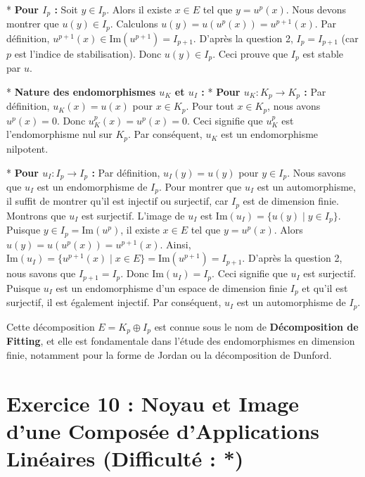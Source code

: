 \documentclass{report}
\begin{document}
        *   \textbf{Pour $I_p$ :}
            Soit $y \in I_p$. Alors il existe $x \in E$ tel que $y = u^p(x)$.
            Nous devons montrer que $u(y) \in I_p$.
            Calculons $u(y) = u(u^p(x)) = u^{p+1}(x)$.
            Par définition, $u^{p+1}(x) \in \mathrm{Im}(u^{p+1}) = I_{p+1}$.
            D'après la question 2, $I_p = I_{p+1}$ (car $p$ est l'indice de stabilisation).
            Donc $u(y) \in I_p$.
            Ceci prouve que $I_p$ est stable par $u$.

    *   \textbf{Nature des endomorphismes $u_K$ et $u_I$ :}
        *   \textbf{Pour $u_K : K_p \to K_p$ :}
            Par définition, $u_K(x) = u(x)$ pour $x \in K_p$.
            Pour tout $x \in K_p$, nous avons $u^p(x) = 0$.
            Donc $u_K^p(x) = u^p(x) = 0$.
            Ceci signifie que $u_K^p$ est l'endomorphisme nul sur $K_p$.
            Par conséquent, $u_K$ est un endomorphisme nilpotent.

        *   \textbf{Pour $u_I : I_p \to I_p$ :}
            Par définition, $u_I(y) = u(y)$ pour $y \in I_p$.
            Nous savons que $u_I$ est un endomorphisme de $I_p$.
            Pour montrer que $u_I$ est un automorphisme, il suffit de montrer qu'il est injectif ou surjectif, car $I_p$ est de dimension finie.
            Montrons que $u_I$ est surjectif.
            L'image de $u_I$ est $\mathrm{Im}(u_I) = \{u(y) \mid y \in I_p\}$.
            Puisque $y \in I_p = \mathrm{Im}(u^p)$, il existe $x \in E$ tel que $y = u^p(x)$.
            Alors $u(y) = u(u^p(x)) = u^{p+1}(x)$.
            Ainsi, $\mathrm{Im}(u_I) = \{u^{p+1}(x) \mid x \in E\} = \mathrm{Im}(u^{p+1}) = I_{p+1}$.
            D'après la question 2, nous savons que $I_{p+1} = I_p$.
            Donc $\mathrm{Im}(u_I) = I_p$.
            Ceci signifie que $u_I$ est surjectif.
            Puisque $u_I$ est un endomorphisme d'un espace de dimension finie $I_p$ et qu'il est surjectif, il est également injectif.
            Par conséquent, $u_I$ est un automorphisme de $I_p$.

Cette décomposition $E = K_p \oplus I_p$ est connue sous le nom de \textbf{Décomposition de Fitting}, et elle est fondamentale dans l'étude des endomorphismes en dimension finie, notamment pour la forme de Jordan ou la décomposition de Dunford.

\newpage
\chapter*{Exercice 10 : Noyau et Image d'une Composée d'Applications Linéaires (Difficulté : \textbf{}*)}
\end{document}
